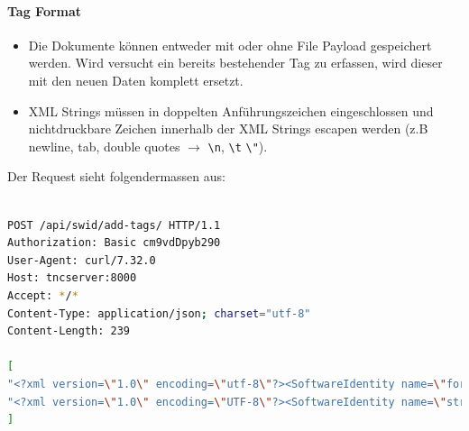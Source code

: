 \documentclass[10pt,a4paper]{scrartcl}
\newcommand*{\escape}[1]{\texttt{\textbackslash#1}}
\begin{document}
\paragraph{Tag Format}
\begin{itemize}
\item Die Dokumente können entweder mit oder ohne File Payload gespeichert werden. Wird versucht ein bereits bestehender Tag zu erfassen, wird dieser mit den neuen Daten komplett ersetzt.
\item XML Strings müssen in doppelten Anführungszeichen eingeschlossen und nichtdruckbare Zeichen innerhalb der XML Strings escapen werden (z.B newline, tab, double quotes $\rightarrow$ \escape{n}, \escape{t} \escape{"}).

\end{itemize}

Der Request sieht folgendermassen aus:
\begin{lstlisting}[language=BASH]

POST /api/swid/add-tags/ HTTP/1.1
Authorization: Basic cm9vdDpyb290
User-Agent: curl/7.32.0
Host: tncserver:8000
Accept: */*
Content-Type: application/json; charset="utf-8"
Content-Length: 239

[
"<?xml version=\"1.0\" encoding=\"utf-8\"?><SoftwareIdentity name=\"fortune-mod\"...",
"<?xml version=\"1.0\" encoding=\"UTF-8\"?><SoftwareIdentity name=\"strongswan\"..."
]
\end{lstlisting}
\end{document}
